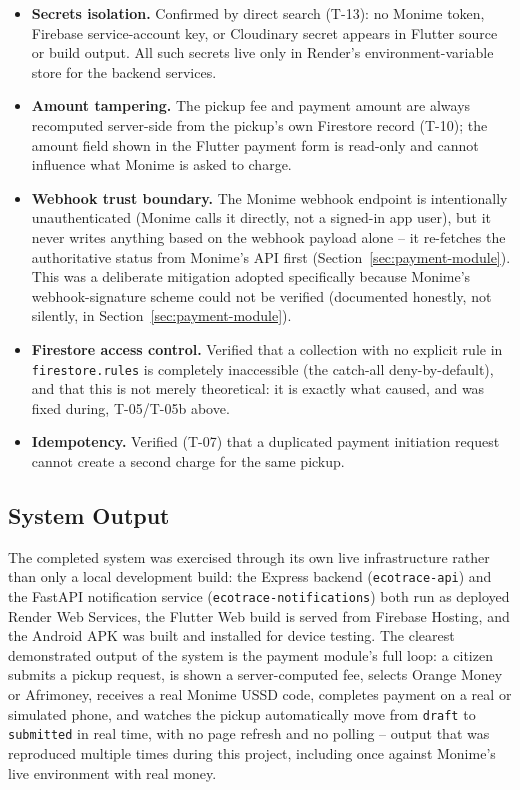 \begin{itemize}
  \item \textbf{Secrets isolation.} Confirmed by direct search (T-13): no
    Monime token, Firebase service-account key, or Cloudinary secret appears
    in Flutter source or build output. All such secrets live only in Render's
    environment-variable store for the backend services.
  \item \textbf{Amount tampering.} The pickup fee and payment amount are
    always recomputed server-side from the pickup's own Firestore record
    (T-10); the amount field shown in the Flutter payment form is read-only
    and cannot influence what Monime is asked to charge.
  \item \textbf{Webhook trust boundary.} The Monime webhook endpoint is
    intentionally unauthenticated (Monime calls it directly, not a signed-in
    app user), but it never writes anything based on the webhook payload
    alone -- it re-fetches the authoritative status from Monime's API first
    (Section~\ref{sec:payment-module}). This was a deliberate mitigation
    adopted specifically because Monime's webhook-signature scheme could not
    be verified (documented honestly, not silently, in
    Section~\ref{sec:payment-module}).
  \item \textbf{Firestore access control.} Verified that a collection with no
    explicit rule in \texttt{firestore.rules} is completely inaccessible (the
    catch-all deny-by-default), and that this is not merely theoretical: it is
    exactly what caused, and was fixed during, T-05/T-05b above.
  \item \textbf{Idempotency.} Verified (T-07) that a duplicated payment
    initiation request cannot create a second charge for the same pickup.
\end{itemize}

\subsection{System Output}

The completed system was exercised through its own live infrastructure
rather than only a local development build: the Express backend
(\texttt{ecotrace-api}) and the FastAPI notification service
(\texttt{ecotrace-notifications}) both run as deployed Render Web Services,
the Flutter Web build is served from Firebase Hosting, and the Android APK
was built and installed for device testing. The clearest demonstrated output
of the system is the payment module's full loop: a citizen submits a pickup
request, is shown a server-computed fee, selects Orange Money or Afrimoney,
receives a real Monime USSD code, completes payment on a real or simulated
phone, and watches the pickup automatically move from \texttt{draft} to
\texttt{submitted} in real time, with no page refresh and no polling -- output
that was reproduced multiple times during this project, including once
against Monime's live environment with real money.

